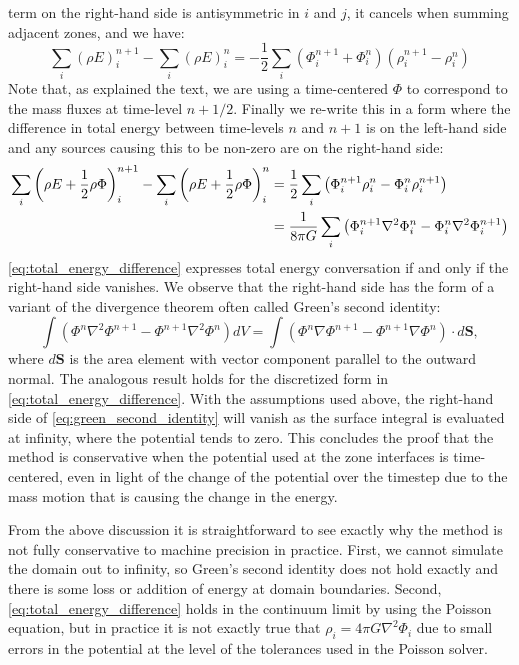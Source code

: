 \documentclass[12pt]{article}
\begin{document}
term on the right-hand side is antisymmetric in $i$ and $j$, it cancels when summing adjacent zones, and we have:
\begin{equation*}
  \sum_{i} (\rho E)_i^{n+1} - \sum_{i} (\rho E)_i^{n} = -\frac{1}{2}\sum_{i} (\Phi_{i}^{n+1} + \Phi_{i}^{n})(\rho_i^{n+1} - \rho_i^{n})
\end{equation*}
Note that, as explained the text, we are using a time-centered $\Phi$ to correspond to the mass fluxes
at time-level $n+1/2$. Finally we re-write this in a form where the difference in total energy between time-levels
$n$ and $n+1$ is on the left-hand side and any sources causing this to be non-zero are on the right-hand side:
\begin{align}
  \sum_{i} \left(\rho E + \frac{1}{2}\rho\Phi\right)_i^{n+1} - \sum_{i} \left(\rho E + \frac{1}{2}\rho\Phi\right)_i^{n} &= \frac{1}{2}\sum_{i} \left(\Phi_i^{n+1}\rho_i^{n} - \Phi_i^{n}\rho_i^{n+1}\right) \notag \\
       &= \frac{1}{8\pi G} \sum_{i}\left(\Phi_{i}^{n+1}\nabla^2 \Phi_{i}^{n} - \Phi_i^{n}\nabla^2 \Phi_{i}^{n+1}\right) \label{eq:total_energy_difference}
\end{align}
\autoref{eq:total_energy_difference} expresses total energy conversation if and only if the right-hand side vanishes.
We observe that the right-hand side has the form of a variant of the divergence theorem often called Green's second identity:
\begin{equation}
  \int (\Phi^{n}\nabla^2 \Phi^{n+1} - \Phi^{n+1}\nabla^2 \Phi^{n}) dV = \int \left(\Phi^{n} \nabla \Phi^{n+1} - \Phi^{n+1} \nabla \Phi^{n}\right) \cdot d\mathbf{S}, \label{eq:green_second_identity}
\end{equation}
where $d\mathbf{S}$ is the area element with vector component parallel to the outward normal. The analogous result holds for the
discretized form in \autoref{eq:total_energy_difference}. With the assumptions used above, the right-hand side of
\autoref{eq:green_second_identity} will vanish as the surface integral is evaluated at infinity, where the potential
tends to zero. This concludes the proof that the method is conservative when the potential used at the zone interfaces
is time-centered, even in light of the change of the potential over the timestep due to the mass motion that is causing the change in the energy.

From the above discussion it is straightforward to see exactly why the method is not fully conservative to machine
precision in practice. First, we cannot simulate the domain out to infinity, so Green's second identity does not hold exactly
and there is some loss or addition of energy at domain boundaries. Second, \autoref{eq:total_energy_difference} holds in the
continuum limit by using the Poisson equation, but in practice it is not exactly true that $\rho_i = 4\pi G \nabla^2 \Phi_{i}$ due
to small errors in the potential at the level of the tolerances used in the Poisson solver.
\end{document}
